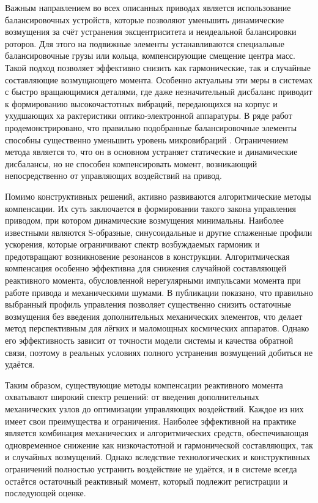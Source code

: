 Важным направлением во всех описанных приводах является использование балансировочных устройств, которые позволяют уменьшить динамические возмущения за счёт устранения эксцентриситета и неидеальной балансировки роторов. Для этого на подвижные элементы устанавливаются специальные балансировочные грузы или кольца, компенсирующие смещение центра масс. Такой подход позволяет эффективно снизить как гармонические, так и случайные составляющие возмущающего момента. Особенно актуальны эти меры в системах с быстро вращающимися деталями, где даже незначительный дисбаланс приводит к формированию высокочастотных вибраций, передающихся на корпус и ухудшающих ха рактеристики оптико-электронной аппаратуры. В ряде работ продемонстрировано, что правильно подобранные балансировочные элементы способны существенно уменьшить уровень микровибраций \cite{liu2008reaction,alcorn2018fully}. Ограничением метода является то, что он в основном устраняет статические и динамические дисбалансы, но не способен компенсировать момент, возникающий непосредственно от управляющих воздействий на привод.

Помимо конструктивных решений, активно развиваются алгоритмические методы компенсации. Их суть заключается в формировании такого закона управления приводом, при котором динамические возмущения минимальны. Наиболее известными являются S-образные, синусоидальные и другие сглаженные профили ускорения, которые ограничивают спектр возбуждаемых гармоник и предотвращают возникновение резонансов в конструкции. Алгоритмическая компенсация особенно эффективна для снижения случайной составляющей реактивного момента, обусловленной нерегулярными импульсами момента при работе привода и механическими шумами. В публикации \cite{singer1990preshaping,singhose2009command} показано, что правильно выбранный профиль управления позволяет существенно снизить остаточные возмущения без введения дополнительных механических элементов, что делает метод перспективным для лёгких и маломощных космических аппаратов. Однако его эффективность зависит от точности модели системы и качества обратной связи, поэтому в реальных условиях полного устранения возмущений добиться не удаётся.

Таким образом, существующие методы компенсации реактивного момента охватывают широкий спектр решений: от введения дополнительных механических узлов до оптимизации управляющих воздействий. Каждое из них имеет свои преимущества и ограничения. Наиболее эффективной на практике является комбинация механических и алгоритмических средств, обеспечивающая одновременное снижение как низкочастотной и гармонической составляющих, так и случайных возмущений. Однако вследствие технологических и конструктивных ограничений полностью устранить воздействие не удаётся, и в системе всегда остаётся остаточный реактивный момент, который подлежит регистрации и последующей оценке.


